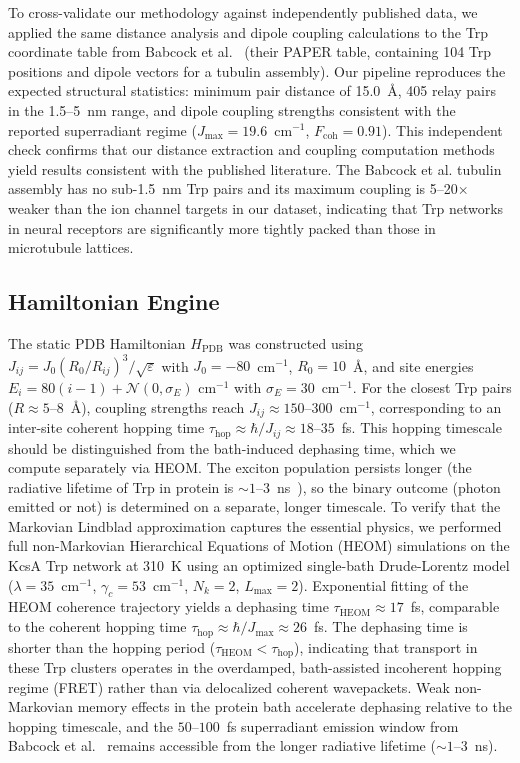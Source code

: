 \documentclass[aps,pre,twocolumn,showpacs,superscriptaddress]{revtex4-2}
\begin{document}
To cross-validate our methodology against independently published data, we applied the same distance analysis and dipole coupling calculations to the Trp coordinate table from Babcock et al.~\cite{Babcock2024} (their PAPER table, containing 104 Trp positions and dipole vectors for a tubulin assembly). Our pipeline reproduces the expected structural statistics: minimum pair distance of 15.0~\AA{}, 405 relay pairs in the 1.5--5~nm range, and dipole coupling strengths consistent with the reported superradiant regime ($J_{\max} = 19.6$~cm$^{-1}$, $F_{\mathrm{coh}} = 0.91$). This independent check confirms that our distance extraction and coupling computation methods yield results consistent with the published literature. The Babcock et al. tubulin assembly has no sub-1.5~nm Trp pairs and its maximum coupling is 5--20$\times$ weaker than the ion channel targets in our dataset, indicating that Trp networks in neural receptors are significantly more tightly packed than those in microtubule lattices.

\subsection{Hamiltonian Engine}

The static PDB Hamiltonian $H_{\mathrm{PDB}}$ was constructed using $J_{ij} = J_0 (R_0/R_{ij})^3 / \sqrt{\varepsilon}$ with $J_0 = -80$~cm$^{-1}$, $R_0 = 10$~\AA, and site energies $E_i = 80(i-1) + \mathcal{N}(0, \sigma_E)$ cm$^{-1}$ with $\sigma_E = 30$~cm$^{-1}$. For the closest Trp pairs ($R \approx 5$--$8$~\AA), coupling strengths reach $J_{ij} \approx 150$--$300$~cm$^{-1}$, corresponding to an inter-site coherent hopping time $\tau_{\mathrm{hop}} \approx \hbar / J_{ij} \approx 18$--$35$~fs. This hopping timescale should be distinguished from the bath-induced dephasing time, which we compute separately via HEOM. The exciton population persists longer (the radiative lifetime of Trp in protein is $\sim 1$--$3$~ns~\cite{Lakowicz2006}), so the binary outcome (photon emitted or not) is determined on a separate, longer timescale. To verify that the Markovian Lindblad approximation captures the essential physics, we performed full non-Markovian Hierarchical Equations of Motion (HEOM) simulations on the KcsA Trp network at 310~K using an optimized single-bath Drude-Lorentz model ($\lambda = 35$~cm$^{-1}$, $\gamma_c = 53$~cm$^{-1}$, $N_k = 2$, $L_{\max} = 2$). Exponential fitting of the HEOM coherence trajectory yields a dephasing time $\tau_{\mathrm{HEOM}} \approx 17$~fs, comparable to the coherent hopping time $\tau_{\mathrm{hop}} \approx \hbar / J_{\max} \approx 26$~fs. The dephasing time is shorter than the hopping period ($\tau_{\mathrm{HEOM}} < \tau_{\mathrm{hop}}$), indicating that transport in these Trp clusters operates in the overdamped, bath-assisted incoherent hopping regime (FRET) rather than via delocalized coherent wavepackets. Weak non-Markovian memory effects in the protein bath accelerate dephasing relative to the hopping timescale, and the $50$--$100$~fs superradiant emission window from Babcock et al.~\cite{Babcock2024} remains accessible from the longer radiative lifetime ($\sim 1$--$3$~ns).
\end{document}
